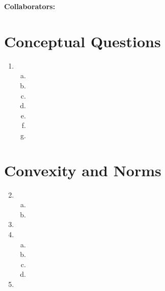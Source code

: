 \documentclass{article}
\newcommand{\1}[1]{\mathbf{1}\left\{#1\right\}}
\begin{document}
\textbf{Collaborators:}
\section*{Conceptual Questions}
\begin{enumerate}[1.]
\item \begin{enumerate}[a.]
      \item
      \item
      \item
      \item
      \item
      \item
      \item
      \end{enumerate}
\end{enumerate}

\section*{Convexity and Norms}
\begin{enumerate}[1.]
\setcounter{enumi}{1}
\item \begin{enumerate}[a.]
      \item
      \item
      \end{enumerate}
\item
\item \begin{enumerate}[a.]
      \item
      \item
      \item
      \item
      \end{enumerate}
\item
\end{enumerate}
\end{document}
